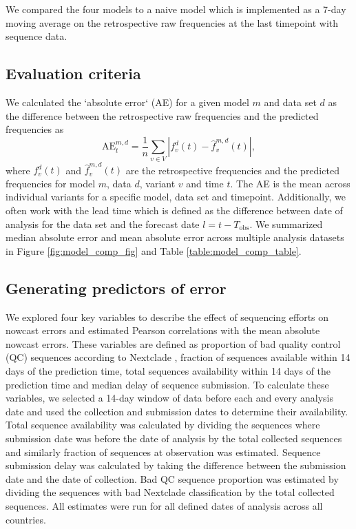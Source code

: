 \documentclass[11pt,oneside,letterpaper]{article}
\begin{document}
We compared the four models to a naive model which is implemented as a 7-day moving average on the retrospective raw frequencies at the last timepoint with sequence data.

\subsection*{Evaluation criteria}

We calculated the `absolute error` (AE) for a given model $m$ and data set $d$ as the difference between the retrospective raw frequencies and the predicted frequencies as
\begin{equation}
    \mathrm{AE}_{t}^{m,d} = \frac{1}{n} \sum_{v \in V} \left|f_{v}^{d}(t) - \hat{f}^{m,d}_{v}(t) \right|,
\end{equation}
where $f_{v}^{d}(t)$ and $\hat{f}_{v}^{m,d}(t)$ are the retrospective frequencies and the predicted frequencies for model $m$, data $d$, variant $v$ and time $t$.
The AE is the mean across individual variants for a specific model, data set and timepoint.
Additionally, we often work with the lead time which is defined as the difference between date of analysis for the data set and the forecast date $l = t - T_{\text{obs}}$.
We summarized median absolute error and mean absolute error across multiple analysis datasets in Figure \ref{fig:model_comp_fig} and Table \ref{table:model_comp_table}.

\subsection*{Generating predictors of error}

We explored four key variables to describe the effect of sequencing efforts on nowcast errors and estimated Pearson correlations with the mean absolute nowcast errors.
These variables are defined as proportion of bad quality control (QC) sequences according to Nextclade \cite{aksamentov2021nextclade}, fraction of sequences available within 14 days of the prediction time, total sequences availability within 14 days of the prediction time and median delay of sequence submission.
To calculate these variables, we selected a 14-day window of data before each and every analysis date and used the collection and submission dates to determine their availability.
Total sequence availability was calculated by dividing the sequences where submission date was before the date of analysis by the total collected sequences and similarly fraction of sequences at observation was estimated.
Sequence submission delay was calculated by taking the difference between the submission date and the date of collection.
Bad QC sequence proportion was estimated by dividing the sequences with bad Nextclade classification by the total collected sequences.
All estimates were run for all defined dates of analysis across all countries.
\end{document}
